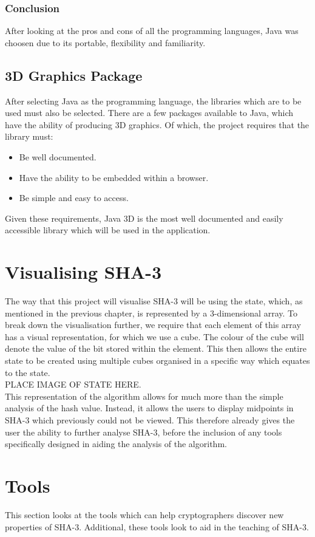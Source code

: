 \subsubsection{Conclusion}
After looking at the pros and cons of all the programming languages, Java was choosen due to its portable, flexibility and familiarity.
\subsection{3D Graphics Package}
After selecting Java as the programming language, the libraries which are to be used must also be selected. There are a few packages available to Java, which have the ability of producing 3D graphics. Of which, the project requires that the library must:
\begin{itemize}
\item Be well documented.
\item Have the ability to be embedded within a browser.
\item Be simple and easy to access.
\end{itemize}
Given these requirements, Java 3D\cite{Java3dLib} is the most well documented and easily accessible library which will be used in the application.
\section{Visualising SHA-3}
 The way that this project will visualise SHA-3 will be using the state, which, as mentioned in the previous chapter, is represented by a 3-dimensional array. To break down the visualisation further, we require that each element of this array has a visual representation, for which we use a cube. The colour of the cube  will denote the value of the bit stored within the element. This then allows the entire state to be created using multiple cubes organised in a specific way which equates to the state.
\vspace{5 mm}\\
PLACE IMAGE OF STATE HERE.
\vspace{5 mm}\\
This representation of the algorithm allows for much more than the simple analysis of the hash value. Instead, it allows the users to display midpoints in SHA-3 which previously could not be viewed. This therefore already gives the user the ability to further analyse SHA-3, before the inclusion of any tools specifically designed in aiding the analysis of the algorithm.
\section{Tools}
This section looks at the tools which can help cryptographers discover new properties of SHA-3. Additional, these tools look to aid in the teaching of SHA-3.
